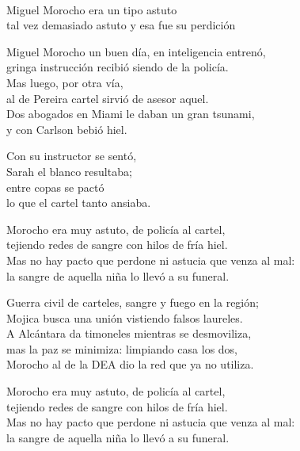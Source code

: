 \begin{lyrics}


\\
Miguel Morocho era un tipo astuto\\
tal vez demasiado astuto y esa fue su perdición

Miguel Morocho un buen día, en inteligencia entrenó,\\
gringa instrucción recibió siendo de la policía.\\
Mas luego, por otra vía,\\
al de Pereira cartel sirvió de asesor aquel.\\
Dos abogados en Miami le daban un gran tsunami,\\
y con Carlson bebió hiel.

Con su instructor se sentó,\\
Sarah el blanco resultaba;\\
entre copas se pactó\\
lo que el cartel tanto ansiaba.

Morocho era muy astuto, de policía al cartel,\\
tejiendo redes de sangre con hilos de fría hiel.\\
Mas no hay pacto que perdone ni astucia que venza al mal:\\
la sangre de aquella niña lo llevó a su funeral.


Guerra civil de carteles, sangre y fuego en la región;\\
Mojica busca una unión vistiendo falsos laureles.\\
A Alcántara da timoneles mientras se desmoviliza,\\
mas la paz se minimiza: limpiando casa los dos,\\
Morocho al de la DEA dio la red que ya no utiliza.

Morocho era muy astuto, de policía al cartel,\\
tejiendo redes de sangre con hilos de fría hiel.\\
Mas no hay pacto que perdone ni astucia que venza al mal:\\
la sangre de aquella niña lo llevó a su funeral.


\end{lyrics}
